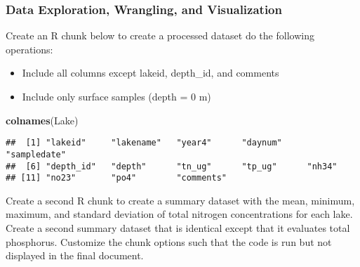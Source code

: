 \documentclass[]{article}
\newenvironment{Shaded}{\begin{snugshade}}{\end{snugshade}}
\newcommand{\KeywordTok}[1]{\textcolor[rgb]{0.13,0.29,0.53}{\textbf{#1}}}
\newcommand{\DecValTok}[1]{\textcolor[rgb]{0.00,0.00,0.81}{#1}}
\newcommand{\StringTok}[1]{\textcolor[rgb]{0.31,0.60,0.02}{#1}}
\newcommand{\OperatorTok}[1]{\textcolor[rgb]{0.81,0.36,0.00}{\textbf{#1}}}
\newcommand{\NormalTok}[1]{#1}
\providecommand{\tightlist}{%
  \setlength{\itemsep}{0pt}\setlength{\parskip}{0pt}}
\begin{document}
\subsubsection{Data Exploration, Wrangling, and
Visualization}\label{data-exploration-wrangling-and-visualization}

Create an R chunk below to create a processed dataset do the following
operations:

\begin{itemize}
\tightlist
\item
  Include all columns except lakeid, depth\_id, and comments
\item
  Include only surface samples (depth = 0 m)
\end{itemize}

\begin{Shaded}
\begin{Highlighting}[]
\KeywordTok{colnames}\NormalTok{(Lake)}
\end{Highlighting}
\end{Shaded}

\begin{verbatim}
##  [1] "lakeid"     "lakename"   "year4"      "daynum"     "sampledate"
##  [6] "depth_id"   "depth"      "tn_ug"      "tp_ug"      "nh34"      
## [11] "no23"       "po4"        "comments"
\end{verbatim}

\begin{Shaded}
\end{Shaded}

Create a second R chunk to create a summary dataset with the mean,
minimum, maximum, and standard deviation of total nitrogen
concentrations for each lake. Create a second summary dataset that is
identical except that it evaluates total phosphorus. Customize the chunk
options such that the code is run but not displayed in the final
document.
\end{document}
